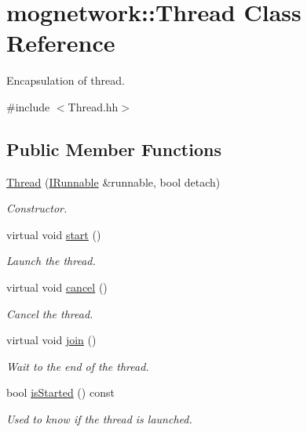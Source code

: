 \hypertarget{classmognetwork_1_1_thread}{\section{mognetwork\-:\-:Thread Class Reference}
\label{classmognetwork_1_1_thread}
}


Encapsulation of thread.  




{\ttfamily \#include $<$Thread.\-hh$>$}

\subsection*{Public Member Functions}
\begin{DoxyCompactItemize}
\item 
\hyperlink{classmognetwork_1_1_thread_af62df267bb08a768111b98e46b9d8675}{Thread} (\hyperlink{classmognetwork_1_1_i_runnable}{I\-Runnable} \&runnable, bool detach)
\begin{DoxyCompactList}\small\item\em Constructor. \end{DoxyCompactList}\item 
\hypertarget{classmognetwork_1_1_thread_af50e944ca134178706495a3448a263fc}{virtual void \hyperlink{classmognetwork_1_1_thread_af50e944ca134178706495a3448a263fc}{start} ()}\label{classmognetwork_1_1_thread_af50e944ca134178706495a3448a263fc}

\begin{DoxyCompactList}\small\item\em Launch the thread. \end{DoxyCompactList}\item 
\hypertarget{classmognetwork_1_1_thread_a62e7929cde1edc54df6e4a32bc6dac15}{virtual void \hyperlink{classmognetwork_1_1_thread_a62e7929cde1edc54df6e4a32bc6dac15}{cancel} ()}\label{classmognetwork_1_1_thread_a62e7929cde1edc54df6e4a32bc6dac15}

\begin{DoxyCompactList}\small\item\em Cancel the thread. \end{DoxyCompactList}\item 
\hypertarget{classmognetwork_1_1_thread_adc557095ab8d062aad0cbd91e5c5e6ea}{virtual void \hyperlink{classmognetwork_1_1_thread_adc557095ab8d062aad0cbd91e5c5e6ea}{join} ()}\label{classmognetwork_1_1_thread_adc557095ab8d062aad0cbd91e5c5e6ea}

\begin{DoxyCompactList}\small\item\em Wait to the end of the thread. \end{DoxyCompactList}\item 
bool \hyperlink{classmognetwork_1_1_thread_ac980f839f427ef11c0ae74ba5bec9c24}{is\-Started} () const 
\begin{DoxyCompactList}\small\item\em Used to know if the thread is launched. \end{DoxyCompactList}\end{DoxyCompactItemize}
